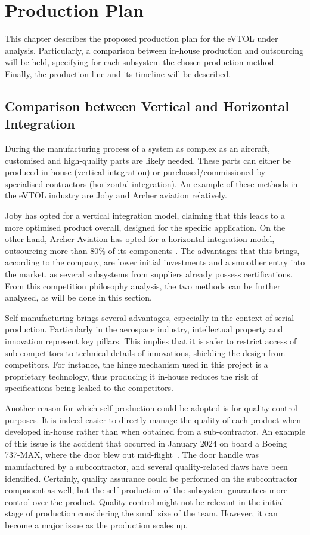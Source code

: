 \chapter{Production Plan}
\label{ch:ProductionPlan}
This chapter describes the proposed production plan for the eVTOL under analysis. 
Particularly, a comparison between in-house production and outsourcing will be held, specifying for each subsystem the chosen production method.
Finally, the production line and its timeline will be described.

\section{Comparison between Vertical and Horizontal Integration}
During the manufacturing process of a system as complex as an aircraft, customised and high-quality parts are likely needed.
These parts can either be produced in-house (vertical integration) or purchased/commissioned by specialised contractors (horizontal integration). An example of these methods in the eVTOL industry are Joby \cite{jobyaviation} and Archer aviation \cite{archer_evtolnews} relatively.

Joby has opted for a vertical integration model, claiming that this leads to a more optimised product overall, designed for the specific application.
On the other hand, Archer Aviation has opted for a horizontal integration model, outsourcing more than 80\% of its components \cite{integration}.
The advantages that this brings, according to the company, are lower initial investments and a smoother entry into the market, as several subsystems from suppliers already possess certifications.
From this competition philosophy analysis, the two methods can be further analysed, as will be done in this section.

Self-manufacturing brings several advantages, especially in the context of serial production.
Particularly in the aerospace industry, intellectual property and innovation represent key pillars. This implies that it is safer to restrict access of sub-competitors to technical details of innovations, shielding the design from competitors.
For instance, the hinge mechanism used in this project is a proprietary technology, thus producing it in-house reduces the risk of specifications being leaked to the competitors.

Another reason for which self-production could be adopted is for quality control purposes.
It is indeed easier to directly manage the quality of each product when developed in-house rather than when obtained from a sub-contractor.
An example of this issue is the accident that occurred in January 2024 on board a Boeing 737-MAX, where the door blew out mid-flight~\cite{incident}.
The door handle was manufactured by a subcontractor, and several quality-related flaws have been identified.
Certainly, quality assurance could be performed on the subcontractor component as well, but the self-production of the subsystem guarantees more control over the product.
Quality control might not be relevant in the initial stage of production considering the small size of the team. However, it can become a major issue as the production scales up.

